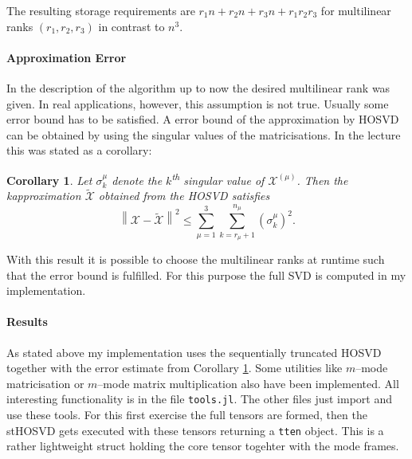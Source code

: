 \documentclass[%
a4paper,
parskip=half,
DIV=calc,
]
{scrartcl}
\newtheorem{corollary}[theorem]{Corollary}
\begin{document}
The resulting storage requirements are
$r_1 n + r_2 n + r_3 n + r_1 r_2 r_3$ for multilinear ranks
$(r_1, r_2, r_3)$ in contrast to $n^3$.

\paragraph{Approximation Error}

In the description of the algorithm up to now the desired multilinear
rank was given.  In real applications, however, this assumption is not
true.  Usually some error bound has to be satisfied.  A error bound of
the approximation by HOSVD can be obtained by using the singular
values of the matricisations.  In the lecture this was stated as a corollary:
\begin{corollary}
  \label{cor:err}
  Let $\sigma_k^{\mu}$ denote the $k$\textsuperscript{th} singular
  value of $\mathcal{X}^{(\mu)}$.  Then the kapproximation
  $\tilde{\mathcal{X}}$ obtained from the HOSVD satisfies
  \begin{equation*}
    \left\| \mathcal{X} - \tilde{\mathcal{X}} \right\|^2 \leq \sum_{\mu = 1}^3 \sum_{k = r_\mu + 1}^{n_\mu}
    \left( \sigma_k^\mu \right)^2.
  \end{equation*}
\end{corollary}
With this result it is possible to choose the multilinear ranks at
runtime such that the error bound is fulfilled.  For this purpose the
full SVD is computed in my implementation.

\paragraph{Results}

As stated above my implementation uses the sequentially truncated
HOSVD together with the error estimate from Corollary \ref{cor:err}.
Some utilities like $m$--mode matricisation or $m$--mode matrix
multiplication also have been implemented. All interesting
functionality is in the file \texttt{tools.jl}. The other files just
import and use these tools.  For this first exercise the full tensors
are formed, then the stHOSVD gets executed with these tensors
returning a \texttt{tten} object. This is a rather lightweight struct
holding the core tensor togehter with the mode frames.
\end{document}
